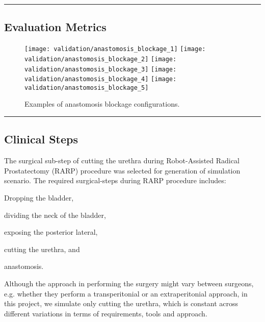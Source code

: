 \hrule%

\subsection{Evaluation Metrics}\label{ssec:evaluation_metrics}

\begin{figure}
  \centering%
	\texttt{[image: validation/anastomosis\_blockage\_1]}\hspace{2ex}
	\texttt{[image: validation/anastomosis\_blockage\_2]}\hspace{2ex}
	\texttt{[image: validation/anastomosis\_blockage\_3]}\hspace{2ex}
	\texttt{[image: validation/anastomosis\_blockage\_4]}\hspace{2ex}
	\texttt{[image: validation/anastomosis\_blockage\_5]}
  \caption{Examples of anastomosis blockage configurations.}\label{fig:anastomosis_leakage}
\end{figure}

\hrule%

\subsection{Clinical Steps}\label{ssec:clinical}
The surgical sub-step of cutting the urethra during Robot-Assisted Radical Prostatectomy (RARP) procedure was selected for generation of simulation scenario. The required surgical-steps during RARP procedure includes:
\begin{inparaenum}[\em i\em)]
  \item Dropping the bladder,
  \item dividing the neck of the bladder,
  \item exposing the posterior lateral,
  \item cutting the urethra, and
  \item anastomosis.
\end{inparaenum}

Although the approach in performing the surgery might vary between surgeons, e.g. whether they perform a transperitonial or an extraperitonial approach, in this project, we simulate only cutting the urethra, which is constant across different variations in terms of requirements, tools and approach.

